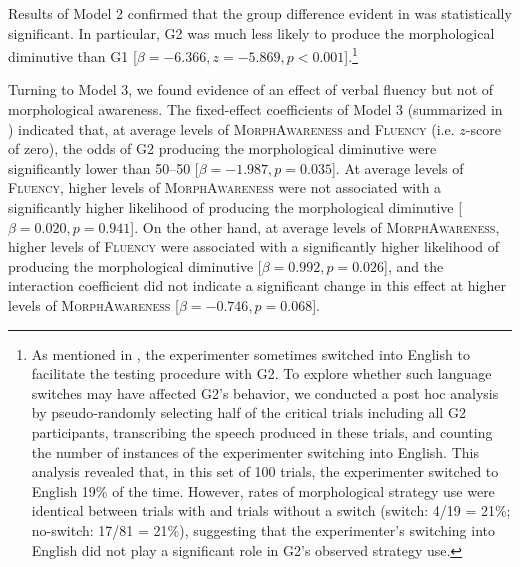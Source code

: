 \documentclass[output=paper,colorlinks,citecolor=brown]{langscibook}
\begin{document}
Results of Model 2 confirmed that the group difference evident in  was statistically significant. In particular, G2 was much less likely to produce the morphological diminutive than G1 [$\beta=-6.366, z=-5.869, p<0.001$].{\footnote{As mentioned in , the experimenter sometimes switched into English to facilitate the testing procedure with G2. To explore whether such language switches may have affected G2's behavior, we conducted a post hoc analysis by pseudo-randomly selecting half of the critical trials including all G2 participants, transcribing the speech produced in these trials, and counting the number of instances of the experimenter switching into English. This analysis revealed that, in this set of 100 trials, the experimenter switched to English 19\% of the time. However, rates of morphological strategy use were identical between trials with and trials without a switch (switch: 4/19 = 21\%; no-switch: 17/81 = 21\%), suggesting that the experimenter's switching into English did not play a significant role in G2's observed strategy use.}}

Turning to Model 3, we found evidence of an effect of verbal fluency but not of morphological awareness. The fixed-effect coefficients of Model 3 (summarized in ) indicated that, at average levels of \textsc{MorphAwareness} and \textsc{Fluency} (i.e. $z$-score of zero), the odds of G2 producing the morphological diminutive were significantly lower than 50–50 [$\beta=-1.987, p=0.035$]. At average levels of \textsc{Fluency}, higher levels of \textsc{MorphAwareness} were not associated with a significantly higher likelihood of producing the morphological diminutive [$\beta=0.020, p=0.941$]. On the other hand, at average levels of \textsc{MorphAwareness}, higher levels of \textsc{Fluency} were associated with a significantly higher likelihood of producing the morphological diminutive [$\beta=0.992, p=0.026$], and the interaction coefficient did not indicate a significant change in this effect at higher levels of \textsc{MorphAwareness} [$\beta=-0.746, p=0.068$]. 
\end{document}
